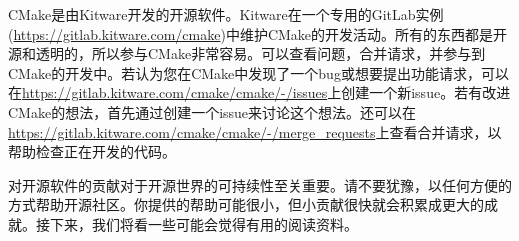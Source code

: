 CMake是由Kitware开发的开源软件。Kitware在一个专用的GitLab实例(\url{https://gitlab.kitware.com/cmake})中维护CMake的开发活动。所有的东西都是开源和透明的，所以参与CMake非常容易。可以查看问题，合并请求，并参与到CMake的开发中。若认为您在CMake中发现了一个bug或想要提出功能请求，可以在\url{https://gitlab.kitware.com/cmake/cmake/-/issues}上创建一个新issue。若有改进CMake的想法，首先通过创建一个issue来讨论这个想法。还可以在\url{https://gitlab.kitware.com/cmake/cmake/-/merge_requests}上查看合并请求，以帮助检查正在开发的代码。

对开源软件的贡献对于开源世界的可持续性至关重要。请不要犹豫，以任何方便的方式帮助开源社区。你提供的帮助可能很小，但小贡献很快就会积累成更大的成就。接下来，我们将看一些可能会觉得有用的阅读资料。